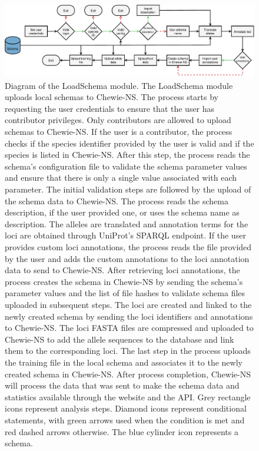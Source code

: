 \newpage
\begin{figure}[h!]
    \centering
    \includegraphics[angle=0,width=\textwidth]{figures/chapter 2/FigureS10.pdf}
    \caption{Diagram of the LoadSchema module. The LoadSchema module uploads local schemas to Chewie-NS. The process starts by requesting the user credentials to ensure that the user has contributor privileges. Only contributors are allowed to upload schemas to Chewie-NS. If the user is a contributor, the process checks if the species identifier provided by the user is valid and if the species is listed in Chewie-NS. After this step, the process reads the schema’s configuration file to validate the schema parameter values and ensure that there is only a single value associated with each parameter. The initial validation steps are followed by the upload of the schema data to Chewie-NS. The process reads the schema description, if the user provided one, or uses the schema name as description. The alleles are translated and annotation terms for the loci are obtained through UniProt’s SPARQL endpoint. If the user provides custom loci annotations, the process reads the file provided by the user and adds the custom annotations to the loci annotation data to send to Chewie-NS. After retrieving loci annotations, the process creates the schema in Chewie-NS by sending the schema’s parameter values and the list of file hashes to validate schema files uploaded in subsequent steps. The loci are created and linked to the newly created schema by sending the loci identifiers and annotations to Chewie-NS. The loci FASTA files are compressed and uploaded to Chewie-NS to add the allele sequences to the database and link them to the corresponding loci. The last step in the process uploads the training file in the local schema and associates it to the newly created schema in Chewie-NS. After process completion, Chewie-NS will process the data that was sent to make the schema data and statistics available through the website and the API. Grey rectangle icons represent analysis steps. Diamond icons represent conditional statements, with green arrows used when the condition is met and red dashed arrows otherwise. The blue cylinder icon represents a schema.}
    \label{fig:chap2_figureS10}
\end{figure}

